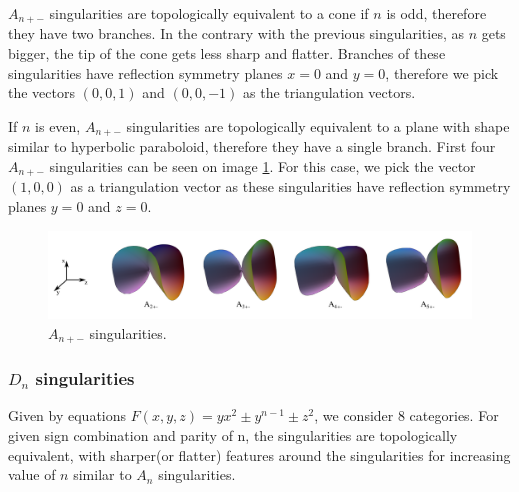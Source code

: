 $A_{n+-}$ singularities are topologically equivalent to a cone if $n$ is odd, therefore
they have two branches.
In the contrary with the previous singularities, as $n$ gets bigger, the tip
of the cone gets less sharp and flatter. Branches of these singularities have 
reflection symmetry planes $x=0$ and $y=0$, therefore we pick the vectors
$(0, 0, 1)$ and $(0, 0, -1)$ as the triangulation vectors.

If $n$ is even, $A_{n+-}$ singularities are topologically equivalent to a plane
with shape similar to hyperbolic paraboloid, therefore they have a single branch.
First four $A_{n+-}$ singularities can be seen on image \ref{img:5}.
For this case, we pick the vector $(1, 0, 0)$ as a triangulation vector as
these singularities have reflection symmetry planes $y=0$ and $z=0$.

\begin{figure}
    \centerline{\includegraphics[width=1\textwidth]{images/img5}}
    \caption[$A_{n+-}$ singularities]
    {$A_{n+-}$ singularities. \cite{singsurf}}
    \label{img:5}
\end{figure}

\subsubsection*{$D_n$ singularities}

Given by equations $F(x,y,z)=yx^2\pm y^{n-1}\pm z^2$, we consider 8 categories.
For given sign combination and parity of n, the singularities are topologically
equivalent, with sharper(or flatter) features around the singularities for increasing
value of $n$ similar to $A_n$ singularities.

